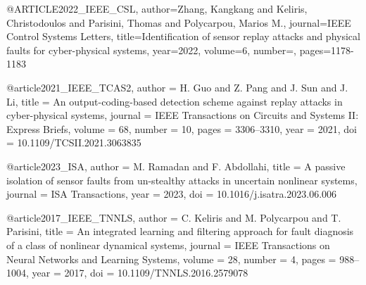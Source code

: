 @ARTICLE{2022_IEEE_CSL,
  author={Zhang, Kangkang and Keliris, Christodoulos and Parisini, Thomas and Polycarpou, Marios M.},
  journal={IEEE Control Systems Letters}, 
  title={Identification of sensor replay attacks and physical faults for cyber-physical systems}, 
  year={2022},
  volume={6},
  number={},
  pages={1178-1183}}

@article{2021_IEEE_TCAS2,
  author    = {H. Guo and Z. Pang and J. Sun and J. Li},
  title     = {An output-coding-based detection scheme against replay attacks in cyber-physical systems},
  journal   = {IEEE Transactions on Circuits and Systems II: Express Briefs},
  volume    = {68},
  number    = {10},
  pages     = {3306--3310},
  year      = {2021},
  doi       = {10.1109/TCSII.2021.3063835}
}

@article{2023_ISA,
  author    = {M. Ramadan and F. Abdollahi},
  title     = {A passive isolation of sensor faults from un-stealthy attacks in uncertain nonlinear systems},
  journal   = {ISA Transactions},
  year      = {2023},
  doi       = {10.1016/j.isatra.2023.06.006}
}

@article{2017_IEEE_TNNLS,
  author    = {C. Keliris and M. Polycarpou and T. Parisini},
  title     = {An integrated learning and filtering approach for fault diagnosis of a class of nonlinear dynamical systems},
  journal   = {IEEE Transactions on Neural Networks and Learning Systems},
  volume    = {28},
  number    = {4},
  pages     = {988--1004},
  year      = {2017},
  doi       = {10.1109/TNNLS.2016.2579078}
}









